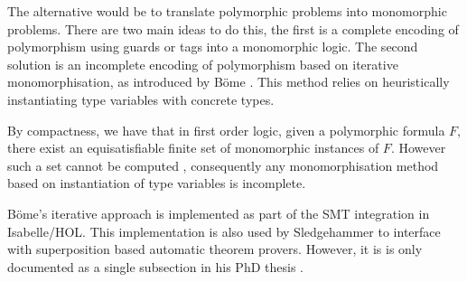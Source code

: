 \documentclass[]{ceurart}
\begin{document}

The alternative would be to translate polymorphic problems into monomorphic problems. There are two main ideas to do this, the first is a complete encoding of polymorphism using guards or tags \cite{mono-trans} into a monomorphic logic. The second solution is an incomplete encoding of polymorphism based on iterative monomorphisation, as introduced by B\"ome \cite[Section 2.2.1]{sb-phd}. This method relies on heuristically instantiating type variables with concrete types.


By compactness, we have that in first order logic, given a polymorphic formula \(F\), there exist an equisatisfiable finite set of monomorphic instances of \(F\). However such a set cannot be computed \cite[Section 2, Theorem 1]{expr-poly-types}, consequently any monomorphisation method based on instantiation of type variables is incomplete.



B\"ome's iterative approach is implemented as part of the SMT integration \cite[Chapter 2]{sb-phd} in Isabelle/HOL. This implementation is also used by Sledgehammer \cite{judgement, hammer} to interface with superposition based automatic theorem provers. However, it is is only documented as a single subsection in his PhD thesis \cite[Section 2.2.1]{sb-phd}.

\bigskip
\end{document}
